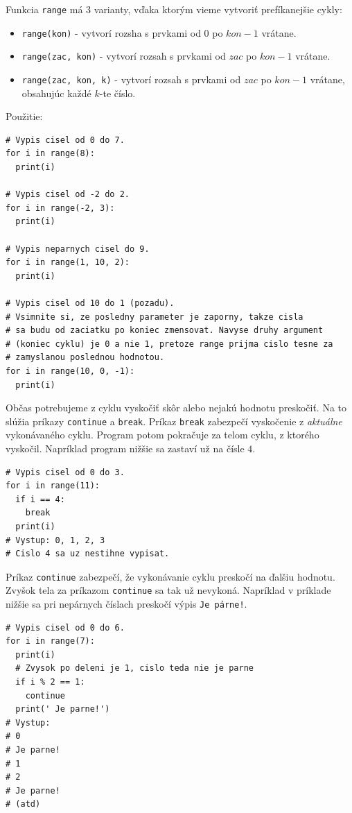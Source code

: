 \documentclass{article}
\begin{document}
Funkcia \texttt{range} má 3 varianty, vďaka ktorým vieme vytvoriť prefíkanejšie cykly:
\begin{itemize}
  \item \texttt{range(kon)} - vytvorí rozsha s prvkami od $0$ po $kon - 1$ vrátane.
  \item \texttt{range(zac, kon)} - vytvorí rozsah s prvkami od $zac$ po $kon - 1$ vrátane.
  \item \texttt{range(zac, kon, k)} - vytvorí rozsah s prvkami od $zac$ po $kon - 1$ vrátane,
  obsahujúc každé $k$-te číslo.
\end{itemize} 

Použitie:
\begin{lstlisting}
# Vypis cisel od 0 do 7.
for i in range(8):
  print(i)

# Vypis cisel od -2 do 2.
for i in range(-2, 3):
  print(i)

# Vypis neparnych cisel do 9.
for i in range(1, 10, 2):
  print(i)

# Vypis cisel od 10 do 1 (pozadu).
# Vsimnite si, ze posledny parameter je zaporny, takze cisla
# sa budu od zaciatku po koniec zmensovat. Navyse druhy argument
# (koniec cyklu) je 0 a nie 1, pretoze range prijma cislo tesne za
# zamyslanou poslednou hodnotou.
for i in range(10, 0, -1):
  print(i)
\end{lstlisting}

Občas potrebujeme z cyklu vyskočiť skôr alebo nejakú hodnotu preskočiť. Na to slúžia príkazy \texttt{continue} a \texttt{break}. Príkaz \texttt{break} zabezpečí vyskočenie z \textit{aktuálne} vykonávaného cyklu. Program potom pokračuje za telom cyklu, z ktorého vyskočil. Napríklad program nižšie sa zastaví už na čísle $4$.
\begin{lstlisting}
# Vypis cisel od 0 do 3.
for i in range(11):
  if i == 4:
    break
  print(i)
# Vystup: 0, 1, 2, 3
# Cislo 4 sa uz nestihne vypisat.
\end{lstlisting}

Príkaz \texttt{continue} zabezpečí, že vykonávanie cyklu preskočí na ďalšiu hodnotu. Zvyšok tela za príkazom \texttt{continue} sa tak už nevykoná. Napríklad v príklade nižšie sa pri nepárnych číslach preskočí výpis 
\texttt{Je párne!}.
\begin{lstlisting}
# Vypis cisel od 0 do 6.
for i in range(7):
  print(i)
  # Zvysok po deleni je 1, cislo teda nie je parne
  if i % 2 == 1:
    continue
  print(' Je parne!')
# Vystup:
# 0 
# Je parne!
# 1
# 2
# Je parne!
# (atd)
\end{lstlisting}
\end{document}
